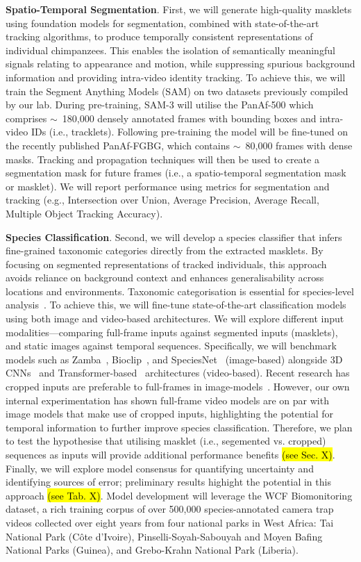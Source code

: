 \textbf{Spatio-Temporal Segmentation}. First, we will generate high-quality masklets using foundation models for segmentation, combined with state-of-the-art tracking algorithms, to produce temporally consistent representations of individual chimpanzees. This enables the isolation of semantically meaningful signals relating to appearance and motion, while suppressing spurious background information and providing intra-video identity tracking. To achieve this, we will train the Segment Anything Models (SAM) on two datasets previously compiled by our lab. During pre-training, SAM-3 will utilise the PanAf-500 which comprises $\sim$~180,000 densely annotated frames with bounding boxes and intra-video IDs (i.e., tracklets). Following pre-training the model will be fine-tuned on the recently published PanAf-FGBG, which contains $\sim$~80,000 frames with dense masks. Tracking and propagation techniques will then be used to create a segmentation mask for future frames (i.e., a spatio-temporal segmentation mask or masklet). We will report performance using metrics for segmentation and tracking (e.g., Intersection over Union, Average Precision, Average Recall, Multiple Object Tracking Accuracy).


\textbf{Species Classification}. Second, we will develop a species classifier that infers fine-grained taxonomic categories directly from the extracted masklets. By focusing on segmented representations of tracked individuals, this approach avoids reliance on background context and enhances generalisability across locations and environments. Taxonomic categorisation is essential for species-level analysis~\cite{}. To achieve this, we will fine-tune state-of-the-art classification models using both image and video-based architectures. We will explore different input modalities—comparing full-frame inputs against segmented inputs (masklets), and static images against temporal sequences. Specifically, we will benchmark models such as Zamba~\cite{}, Bioclip~\cite{}, and SpeciesNet~\cite{} (image-based) alongside 3D CNNs~\cite{} and Transformer-based~\cite{} architectures (video-based). Recent research has cropped inputs are preferable to full-frames in image-models~\cite{}. However, our own internal experimentation has shown full-frame video models are on par with image models that make use of cropped inputs, highlighting the potential for temporal information to further improve species classification. Therefore, we plan to test the hypothesise that utilising masklet (i.e., segemented vs. cropped) sequences as inputs will provide additional performance benefits \hl{(see Sec. X)}. Finally, we will explore model consensus for quantifying uncertainty and identifying sources of error; preliminary results highight the potential in this approach \hl{(see Tab. X)}. Model development will leverage the WCF Biomonitoring dataset, a rich training corpus of over 500,000 species-annotated camera trap videos collected over eight years from four national parks in West Africa: Tai National Park (Côte d’Ivoire), Pinselli-Soyah-Sabouyah and Moyen Bafing National Parks (Guinea), and Grebo-Krahn National Park (Liberia).


